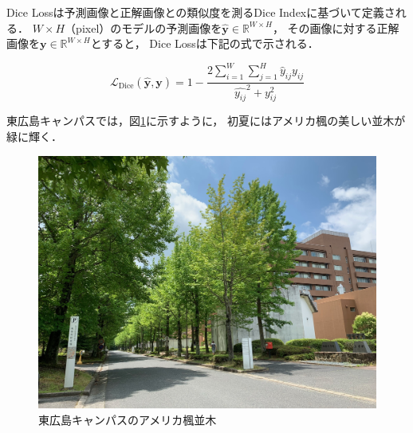 \documentclass[10pt, a4paper, twocolumn]{jarticle}
\begin{document}
Dice Lossは予測画像と正解画像との類似度を測るDice Indexに基づいて定義される．
$W \times H$（pixel）のモデルの予測画像を$\hat{\mathbf{y}} \in \mathbb R ^ {W \times H}$，
その画像に対する正解画像を$\mathbf{y} \in \mathbb R ^ {W \times H}$とすると，
Dice Lossは下記の式で示される．

\begin{equation}
  \mathcal{L}_{\text{Dice}}(\hat{\mathbf{y}}, \mathbf{y}) = 1 - \frac{2 \sum_{i=1}^{W} \sum_{j=1}^{H} \hat{y}_{ij} y_{ij}}{\hat{y_{ij}} ^ 2 + y_{ij} ^ 2}
\end{equation}


東広島キャンパスでは，図\ref{fig:campus}に示すように，
初夏にはアメリカ楓の美しい並木が緑に輝く．
%
\begin{figure}[t]
	\begin{center}
		\includegraphics[width=0.95\hsize]{figure/campus.jpg}
	\end{center}
	\vspace{-12pt} %
	\caption{東広島キャンパスのアメリカ楓並木}
	\label{fig:campus}
\end{figure}
%
\newline
\end{document}
